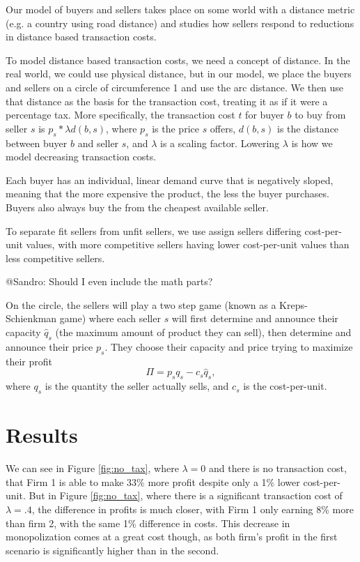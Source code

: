 \documentclass[final,5p,times,twocolumn,11pt]{elsarticle}
\numberwithin{equation}{section} %
\begin{document}
Our model of buyers and sellers takes place on some world with a distance
metric (e.g. a country using road distance) and studies how sellers respond to
reductions in distance based transaction costs.

To model distance based transaction costs, we need a concept of distance.  In
the real world, we could use physical distance, but in our model, we place the
buyers and sellers on a circle of circumference 1 and use the arc distance.
We then use that distance as the basis for the transaction cost, treating it as
if it were a percentage tax. More specifically, the transaction cost $t$ for
buyer $b$ to buy from seller $s$ is $p_s * \lambda d(b, s)$, where $p_s$ is the
price $s$ offers, $d(b, s)$ is the distance between buyer $b$ and seller $s$,
and $\lambda$ is a scaling factor. Lowering $\lambda$ is how we model
decreasing transaction costs.

Each buyer has an individual, linear demand curve that is negatively sloped,
meaning that the more expensive the product, the less the buyer purchases.
Buyers also always buy the from the cheapest available seller.

To separate fit sellers from unfit sellers, we use assign sellers differing
cost-per-unit values, with more competitive sellers having lower cost-per-unit
values than less competitive sellers.

@Sandro: Should I even include the math parts?

On the circle, the sellers will play a two step game (known as a
Kreps-Schienkman game) where each seller $s$ will first determine and announce
their capacity $\hat q_s$ (the maximum amount of product they can sell), then
determine and announce their price $p_s$. They choose their capacity and price
trying to maximize their profit $$\Pi = p_sq_s - c_s\hat q_s,$$ where $q_s$ is
the quantity the seller actually sells, and $c_s$ is the cost-per-unit. 

\section{Results}
We can see in Figure \ref{fig:no_tax}, where $\lambda=0$ and there is no
transaction cost, that Firm 1 is able to make 33\% more profit despite only a
1\% lower cost-per-unit. But in Figure \ref{fig:no_tax}, where there is a
significant transaction cost of $\lambda = .4$, the difference in profits
is much closer, with Firm 1 only earning 8\% more than firm 2, with the same
1\% difference in costs. This decrease in monopolization comes at a great cost
though, as both firm's profit in the first scenario is significantly higher
than in the second.
\end{document}
